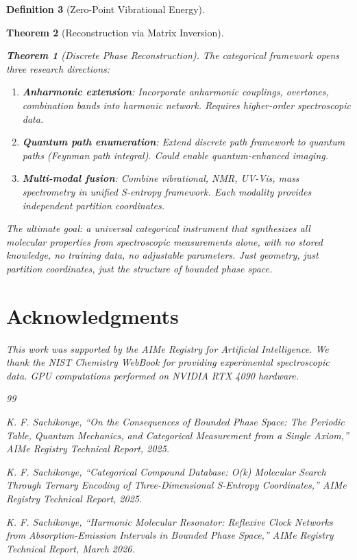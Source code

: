 \documentclass[11pt,a4paper]{article}
\newtheorem{theorem}{Theorem}[section]
\theoremstyle{definition}
\newtheorem{definition}[theorem]{Definition}
\theoremstyle{remark}
\begin{document}
\begin{definition}[Zero-Point Vibrational Energy]
\begin{theorem}[Reconstruction via Matrix Inversion]
\begin{theorem}[Discrete Phase Reconstruction]
The categorical framework opens three research directions:

\begin{enumerate}
\item \textbf{Anharmonic extension}: Incorporate anharmonic couplings, overtones, combination bands into harmonic network. Requires higher-order spectroscopic data.

\item \textbf{Quantum path enumeration}: Extend discrete path framework to quantum paths (Feynman path integral). Could enable quantum-enhanced imaging.

\item \textbf{Multi-modal fusion}: Combine vibrational, NMR, UV-Vis, mass spectrometry in unified S-entropy framework. Each modality provides independent partition coordinates.
\end{enumerate}

The ultimate goal: a universal categorical instrument that synthesizes all molecular properties from spectroscopic measurements alone, with no stored knowledge, no training data, no adjustable parameters. Just geometry, just partition coordinates, just the structure of bounded phase space.

\section*{Acknowledgments}

This work was supported by the AIMe Registry for Artificial Intelligence. We thank the NIST Chemistry WebBook for providing experimental spectroscopic data. GPU computations performed on NVIDIA RTX 4090 hardware.


\begin{thebibliography}{99}

K. F. Sachikonye, ``On the Consequences of Bounded Phase Space: The Periodic Table, Quantum Mechanics, and Categorical Measurement from a Single Axiom,'' \textit{AIMe Registry Technical Report}, 2025.

K. F. Sachikonye, ``Categorical Compound Database: O(k) Molecular Search Through Ternary Encoding of Three-Dimensional S-Entropy Coordinates,'' \textit{AIMe Registry Technical Report}, 2025.

K. F. Sachikonye, ``Harmonic Molecular Resonator: Reflexive Clock Networks from Absorption-Emission Intervals in Bounded Phase Space,'' \textit{AIMe Registry Technical Report}, March 2026.


\end{thebibliography}
\end{theorem}
\end{theorem}
\end{definition}
\end{document}
